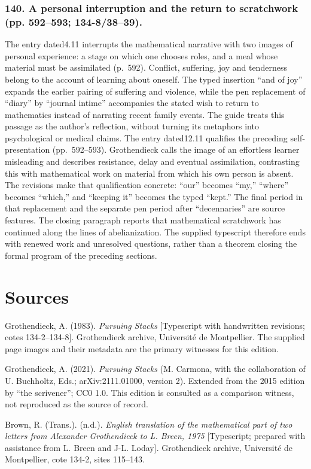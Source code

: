 \documentclass[10pt,oneside]{book}
\begin{document}
\subsection*{140. A personal interruption and the return to scratchwork (pp. 592--593; 134-8/38--39).}
The entry dated4.11 interrupts the mathematical narrative with two images of personal experience: a stage on which one chooses roles, and a meal whose material must be assimilated (p.~592). Conflict, suffering, joy and tenderness belong to the account of learning about oneself. The typed insertion ``and of joy'' expands the earlier pairing of suffering and violence, while the pen replacement of ``diary'' by ``journal intime'' accompanies the stated wish to return to mathematics instead of narrating recent family events. The guide treats this passage as the author's reflection, without turning its metaphors into psychological or medical claims. The entry dated12.11 qualifies the preceding self-presentation (pp.~592--593). Grothendieck calls the image of an effortless learner misleading and describes resistance, delay and eventual assimilation, contrasting this with mathematical work on material from which his own person is absent. The revisions make that qualification concrete: ``our'' becomes ``my,'' ``where'' becomes ``which,'' and ``keeping it'' becomes the typed ``kept.'' The final period in that replacement and the separate pen period after ``decennaries'' are source features. The closing paragraph reports that mathematical scratchwork has continued along the lines of abelianization. The supplied typescript therefore ends with renewed work and unresolved questions, rather than a theorem closing the formal program of the preceding sections.


\chapter*{Sources}
Grothendieck, A. (1983). \emph{Pursuing Stacks} [Typescript with handwritten revisions; cotes 134-2--134-8]. Grothendieck archive, Université de Montpellier. The supplied page images and their metadata are the primary witnesses for this edition.

Grothendieck, A. (2021). \emph{Pursuing Stacks} (M. Carmona, with the collaboration of U. Buchholtz, Eds.; arXiv:2111.01000, version 2). Extended from the 2015 edition by ``the scrivener''; CC0 1.0. This edition is consulted as a comparison witness, not reproduced as the source of record.

Brown, R. (Trans.). (n.d.). \emph{English translation of the mathematical part of two letters from Alexander Grothendieck to L. Breen, 1975} [Typescript; prepared with assistance from L. Breen and J-L. Loday]. Grothendieck archive, Université de Montpellier, cote 134-2, sites 115--143.
\end{document}
